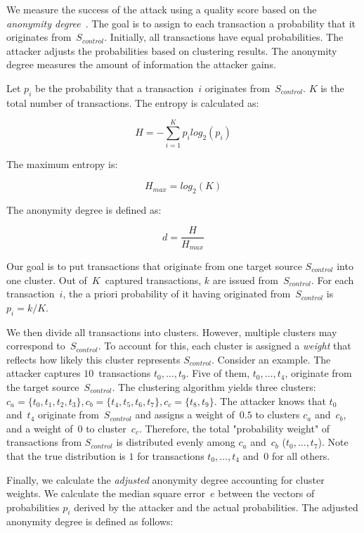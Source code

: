 We measure the success of the attack using a quality score based on the \textit{anonymity degree}~\cite{Diaz2002}.
The goal is to assign to each transaction a probability that it originates from~$S_{control}$.
Initially, all transactions have equal probabilities.
The attacker adjusts the probabilities based on clustering results.
The anonymity degree measures the amount of information the attacker gains.

Let $p_i$ be the probability that a transaction~$i$ originates from~$S_{control}$.
$K$ is the total number of transactions.
The entropy is calculated as:

\[
H = -\sum_{i=1}^K p_i log_2(p_i)
\]

The maximum entropy is:

\[
H_{max} = log_2(K)
\]

The anonymity degree is defined as:

\[
d = \frac{H}{H_{max}}
\]

Our goal is to put transactions that originate from one target source $S_{control}$ into one cluster.
Out of~$K$~captured transactions, $k$ are issued from~$S_{control}$.
For each transaction~$i$, the a priori probability of it having originated from~$S_{control}$ is $p_i = k / K$.

We then divide all transactions into clusters.
However, multiple clusters may correspond to~$S_{control}$.
To account for this, each cluster is assigned a \textit{weight} that reflects how likely this cluster represents $S_{control}$.
Consider an example.
The attacker captures $10$~transactions $t_0, \dots, t_9$.
Five of them, $t_0, \dots, t_4$, originate from the target source~$S_{control}$.
The clustering algorithm yields three clusters: $c_a = \{t_0, t_1, t_2, t_3\}, c_b = \{t_4, t_5, t_6, t_7\}, c_c = \{t_8, t_9\}$.
The attacker knows that $t_0$ and~$t_4$ originate from~$S_{control}$ and assigns a weight of~$0.5$ to clusters $c_a$ and~$c_b$, and a weight of~$0$ to cluster~$c_c$.
Therefore, the total "probability weight" of transactions from $S_{control}$ is distributed evenly among $c_a$ and~$c_b$ ($t_0, \dots, t_7$).
Note that the true distribution is $1$ for transactions $t_0, \dots, t_4$ and~$0$ for all others.

Finally, we calculate the \textit{adjusted} anonymity degree accounting for cluster weights.
We calculate the median square error~$e$ between the vectors of probabilities $p_i$ derived by the attacker and the actual probabilities.
The adjusted anonymity degree is defined as follows:


